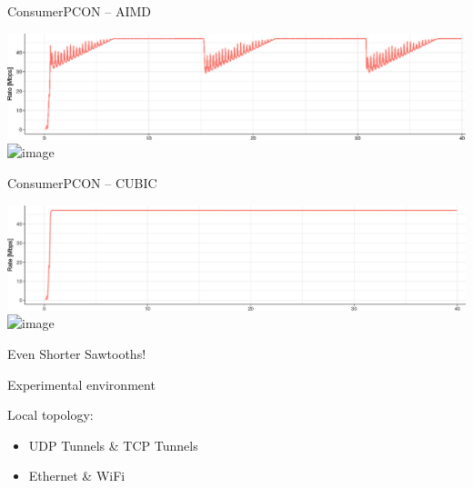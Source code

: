 \begin{frame}{ConsumerPCON -- AIMD}

\includegraphics[width=\linewidth]{figs/cons_pcon_rate.png}\\
\pause
\includegraphics<1-2>[width=\linewidth]{figs/cons_pcon_queue.png}

\end{frame}


\begin{frame}{ConsumerPCON -- CUBIC}

\includegraphics[width=\linewidth]{figs/cons_cubic_rate.png}\\
\pause
\includegraphics<1-2>[width=\linewidth]{figs/cons_cubic_queue.png}

Even Shorter Sawtooths!

\end{frame}













\begin{frame}{Experimental environment}

Local topology:

\begin{itemize}
\item UDP Tunnels \& TCP Tunnels
\item Ethernet \& WiFi
\end{itemize}

\end{frame}

